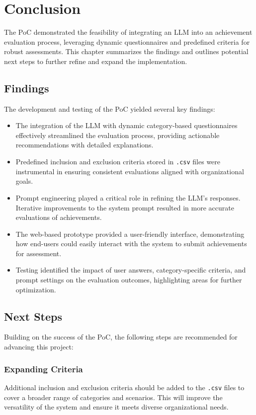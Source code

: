 \chapter{Conclusion}
\label{conclusion}

The \ac{PoC} demonstrated the feasibility of integrating an \ac{LLM} into an achievement evaluation process, leveraging dynamic questionnaires and predefined criteria for robust assessments. 
This chapter summarizes the findings and outlines potential next steps to further refine and expand the implementation.

\section{Findings}
The development and testing of the \ac{PoC} yielded several key findings:
\begin{itemize}
    \item The integration of the \ac{LLM} with dynamic category-based questionnaires effectively streamlined the evaluation process, providing actionable recommendations with detailed explanations.
    \item Predefined inclusion and exclusion criteria stored in \texttt{.csv} files were instrumental in ensuring consistent evaluations aligned with organizational goals.
    \item Prompt engineering played a critical role in refining the \ac{LLM}'s responses. Iterative improvements to the system prompt resulted in more accurate evaluations of achievements.
    \item The web-based prototype provided a user-friendly interface, demonstrating how end-users could easily interact with the system to submit achievements for assessment.
    \item Testing identified the impact of user answers, category-specific criteria, and prompt settings on the evaluation outcomes, highlighting areas for further optimization.
\end{itemize}

\section{Next Steps}
Building on the success of the \ac{PoC}, the following steps are recommended for advancing this project:

\subsection*{Expanding Criteria}
Additional inclusion and exclusion criteria should be added to the \texttt{.csv} files to cover a broader range of categories and scenarios. 
This will improve the versatility of the system and ensure it meets diverse organizational needs.


